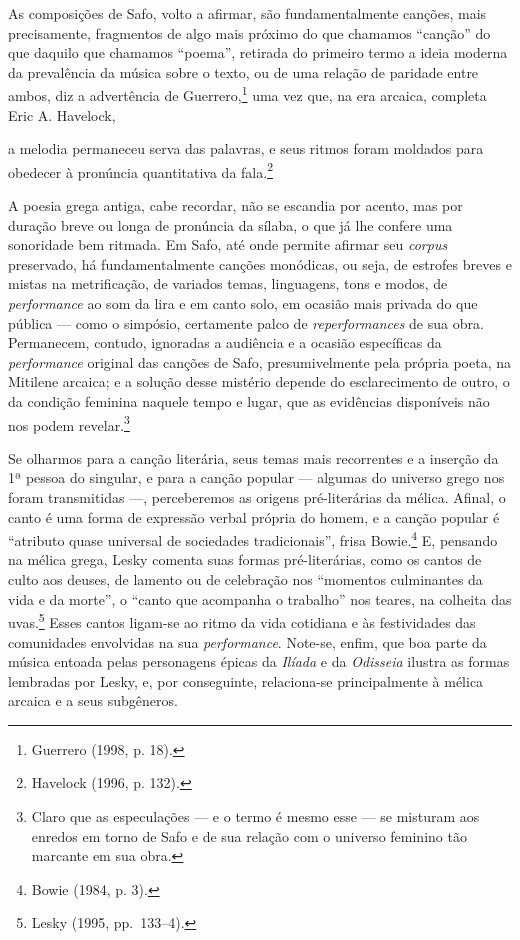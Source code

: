 As composições de Safo, volto a afirmar, são fundamentalmente canções, mais
precisamente, fragmentos de algo mais próximo do que chamamos “canção” do que
daquilo que chamamos “poema”, retirada do primeiro termo a ideia moderna da
prevalência da música sobre o texto, ou de uma relação de paridade entre ambos,
diz a advertência de Guerrero,\footnote{ Guerrero (1998, p. 18).} uma vez que, na era arcaica,
completa Eric A. Havelock, 

\begin{hedraquote}
a melodia permaneceu serva
das palavras, e seus ritmos foram moldados para obedecer à pronúncia
quantitativa da fala.\footnote{ Havelock (1996, p. 132).}
\end{hedraquote}

 A poesia grega antiga, cabe recordar, não se
escandia por acento, mas por duração breve ou longa de pronúncia da sílaba, o
que já lhe confere uma sonoridade bem ritmada. Em Safo, até onde permite
afirmar seu \textit{corpus} preservado, há fundamentalmente canções monódicas,
ou seja, de estrofes breves e mistas na metrificação, de variados temas,
linguagens, tons e modos, de \textit{performance} ao som da lira e em canto
solo, em ocasião mais privada do que pública --- como o simpósio, certamente
palco de \textit{reperformances} de sua obra. Permanecem, contudo, ignoradas a
audiência e a ocasião específicas da \textit{performance} original das canções
de Safo, presumivelmente pela própria poeta, na Mitilene arcaica; e a solução
desse mistério depende do esclarecimento de outro, o da condição feminina
naquele tempo e lugar, que as evidências disponíveis não nos podem
revelar.\footnote{ Claro que as especulações --- e o termo é mesmo esse --- se
misturam aos enredos em torno de Safo e de sua relação com o universo feminino
tão marcante em sua obra.}

Se olharmos para a canção literária, seus temas mais recorrentes e a inserção da
1ª pessoa do singular, e para a canção popular --- algumas do universo grego nos
foram transmitidas ---, perceberemos as origens pré-literárias da mélica. Afinal,
o canto é uma forma de expressão verbal própria do homem, e a canção popular é
“atributo quase universal de sociedades tradicionais”, frisa Bowie.\footnote{
Bowie (1984, p. 3).} E, pensando na mélica grega, Lesky comenta suas formas
pré-literárias, como os cantos de culto aos deuses, de lamento ou de celebração
nos “momentos culminantes da vida e da morte”, o “canto que acompanha o
trabalho” nos teares, na colheita das uvas.\footnote{ Lesky (1995, pp.~133--4).} Esses cantos ligam-se ao ritmo da
vida cotidiana e às festividades das comunidades envolvidas na sua
\textit{performance}. Note-se, enfim, que boa parte da música entoada pelas
personagens épicas da \textit{Ilíada} e da \textit{Odisseia} ilustra as formas
lembradas por Lesky, e, por conseguinte, relaciona-se principalmente à mélica
arcaica e a seus subgêneros.

